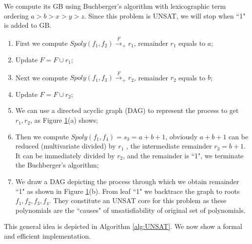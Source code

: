 \begin{Example}
\vspace{0.1in}
We compute its GB using Buchberger's algorithm with lexicographic term ordering $a>b>x>y>z$.
Since this problem is UNSAT, we will stop when ``1" is added to GB.
\begin{enumerate}[{1)}]
\item First we compute $Spoly(f_1,f_2)\xrightarrow{F}_{+} r_1$, remainder $r_1$ equals to $a$;
\item Update $F=F\cup r_1$;
\item Next we compute $Spoly(f_1,f_3)\xrightarrow{F}_{+} r_2$, remainder $r_2$ equals to $b$;
\item Update $F=F\cup r_2$;
\item We can use a directed acyclic graph (DAG) to represent the process to get $r_1,r_2$, as Figure \ref{fig:UNSAT}(a) shows;
\item Then we compute $Spoly(f_1,f_4) = s_3= a+b+1$, obviously $a+b+1$ can be reduced (multivariate divided) by
$r_1$ , the intermediate remainder $r_3 = b+1$. It can be immediately divided by $r_2$, and the remainder is ``1", we
terminate the Buchberger's algorithm;
\item We draw a DAG depicting the process through which we obtain remainder ``1" as shown in Figure \ref{fig:UNSAT}(b). 
From leaf ``1" we backtrace the graph to roots $f_1,f_2,f_3,f_4$. They constitute an UNSAT core for this problem
as these polynomials are the ``causes" of unsatisfiability of original set of polynomials.
\end{enumerate}
\end{Example}
\begin{figure}[h]
\label{fig:UNSAT}
\end{figure}

This general idea is depicted in Algorithm \ref{alg:UNSAT}. 
We now show a formal and efficient implementation.

